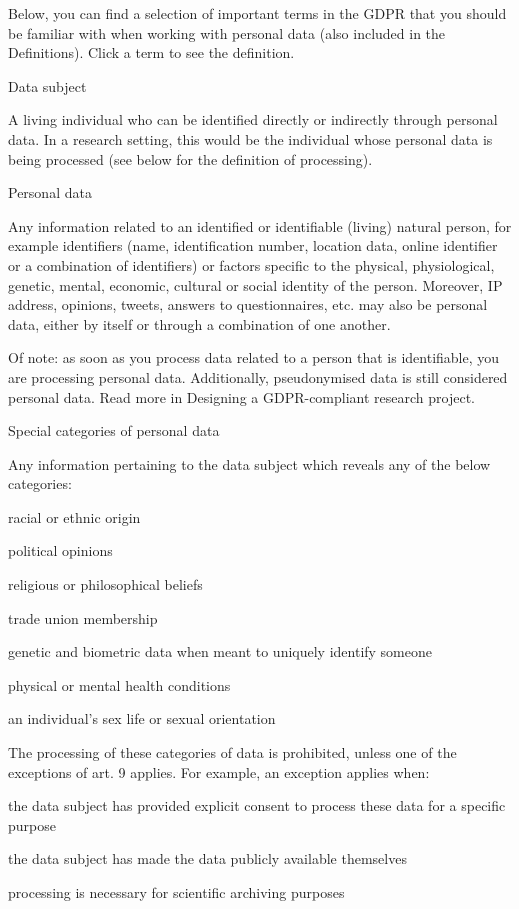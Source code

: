 \documentclass[
]{book}
\begin{document}
Below, you can find a selection of important terms in the GDPR that you should be familiar with
when working with personal data (also included in the Definitions).
Click a term to see the definition.

Data subject

A living individual who can be identified directly or indirectly through personal data.
In a research setting, this would be the individual whose personal data is being processed
(see below for the definition of processing).

Personal data

Any information related to an identified or identifiable (living) natural person, for example
identifiers (name, identification number, location data, online identifier or a combination of
identifiers) or factors specific to the physical, physiological, genetic, mental, economic,
cultural or social identity of the person. Moreover, IP address, opinions, tweets, answers
to questionnaires, etc. may also be personal data, either by itself or through a combination of one another.

Of note: as soon as you process data related to a person that is identifiable, you are
processing personal data. Additionally, pseudonymised data is still considered personal data.
Read more in Designing a GDPR-compliant research project.

Special categories of personal data

Any information pertaining to the data subject which reveals any of the below categories:

racial or ethnic origin

political opinions

religious or philosophical beliefs

trade union membership

genetic and biometric data when meant to uniquely identify someone

physical or mental health conditions

an individual's sex life or sexual orientation

The processing of these categories of data is prohibited, unless one of the
exceptions of art. 9 applies.
For example, an exception applies when:

the data subject has provided explicit consent to process these data for a specific purpose

the data subject has made the data publicly available themselves

processing is necessary for scientific archiving purposes
\end{document}
